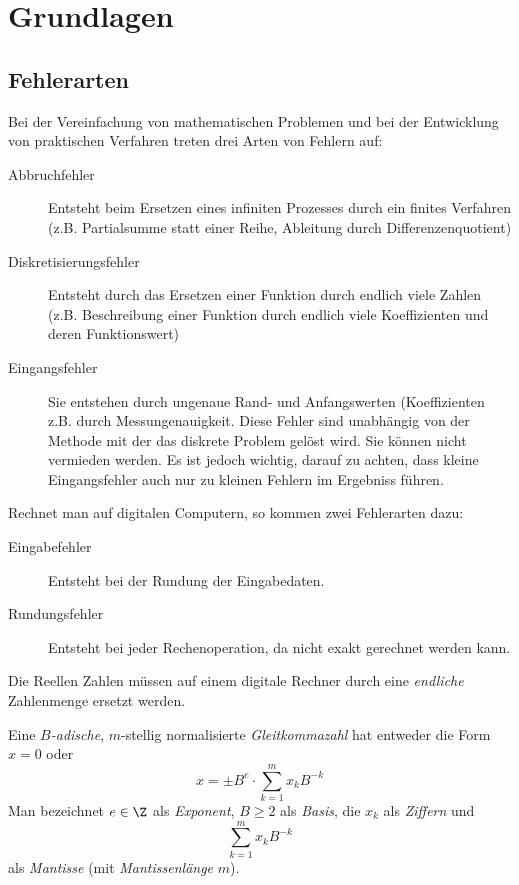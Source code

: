 \documentclass{mycourse}
\begin{document}
\chapter{Grundlagen}

\section{Fehlerarten}

Bei der Vereinfachung von mathematischen Problemen und bei der Entwicklung von 
praktischen Verfahren treten drei Arten von Fehlern auf:
\begin{description}
\item[Abbruchfehler] Entsteht beim Ersetzen eines infiniten Prozesses durch ein finites Verfahren
(z.B. Partialsumme statt einer Reihe, Ableitung durch Differenzenquotient)
\item[Diskretisierungsfehler] Entsteht durch das Ersetzen einer Funktion durch endlich viele Zahlen
	(z.B. Beschreibung einer Funktion durch endlich viele Koeffizienten und deren Funktionswert)
\item[Eingangsfehler] Sie entstehen durch ungenaue Rand- und Anfangswerten (Koeffizienten z.B. durch Messungenauigkeit.
Diese Fehler sind unabhängig von der Methode mit der das diskrete Problem gelöst wird.
Sie können nicht vermieden werden.
Es ist jedoch wichtig, darauf zu achten, dass kleine Eingangsfehler auch nur zu kleinen Fehlern im Ergebniss führen.
\end{description}
Rechnet man auf digitalen Computern, so kommen zwei Fehlerarten dazu:
\begin{description}
\item[Eingabefehler] Entsteht bei der Rundung der Eingabedaten.
\item[Rundungsfehler] Entsteht bei jeder Rechenoperation, da nicht exakt gerechnet werden kann.
\end{description}

Die Reellen Zahlen müssen auf einem digitale Rechner durch eine \emph{endliche} Zahlenmenge ersetzt werden.

\begin{df}
\label{df: 2.1}
	Eine \emph{$B$-adische}, $m$-stellig normalisierte \emph{Gleitkommazahl} hat entweder die Form $x=0$ oder 
\[
	x=\pm B^e \cdot \sum_{k=1}^m x_kB^{-k}
\]
Man bezeichnet $e\in \Z$ als \emph{Exponent}, $B\ge 2$ als \emph{Basis}, die $x_k$ als \emph{Ziffern} und 
\[
	\sum_{k=1}^m x_kB^{-k}
\]
als \emph{Mantisse} (mit \emph{Mantissenlänge} $m$).

\end{df}
\end{document}
